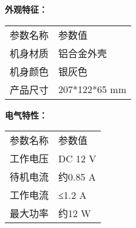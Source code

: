 \noindent\xiaosi\textbf{外观特征：}
\vspace{0.1cm}
\song
\begin{table}[H]
\normalsize
{}
\begin{tabular}{m{6.5cm}|m{6.5cm}}
\rowcolor{myblue}
\color{white}参数名称& \color{white}参数值\\\arrayrulecolor{tabcolor}\midrule[1.2pt]
机身材质& 铝合金外壳\\\arrayrulecolor{tabcolor}\midrule[1.2pt]
机身颜色& 银灰色\\\arrayrulecolor{tabcolor}\midrule[1.2pt]
产品尺寸& 207*122*65 mm\\
\end{tabular}
\end{table}


\vspace{0.4cm}
\noindent\xiaosi\textbf{电气特性：}
\vspace{0.1cm}
\song
\begin{table}[H]
\normalsize
{}
\begin{tabular}{m{6.5cm}|m{6.5cm}}
\rowcolor{myblue}
\color{white}参数名称& \color{white}参数值\\\arrayrulecolor{tabcolor}\midrule[1.2pt]
工作电压& DC 12 V\\\arrayrulecolor{tabcolor}\midrule[1.2pt]
待机电流& 约0.85 A\\\arrayrulecolor{tabcolor}\midrule[1.2pt]
工作电流& ≤1.2 A\\\arrayrulecolor{tabcolor}\midrule[1.2pt]
最大功率& 约12 W\\
\end{tabular}
\end{table}


